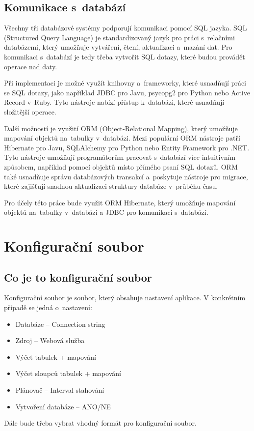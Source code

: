 \documentclass[czech, kiv, ba, he, iso690auyr, pdf]{fasthesis}
\begin{document}
\section{Komunikace s~databází}
Všechny tři databázové systémy podporují komunikaci pomocí SQL jazyka.
SQL (Structured Query Language) je standardizovaný jazyk pro práci s~relačními databázemi,
který umožňuje vytváření, čtení, aktualizaci a~mazání dat.
Pro komunikaci s~databází je tedy třeba vytvořit SQL dotazy, které budou provádět operace nad daty.

Při implementaci je možné využít knihovny a~frameworky, které usnadňují práci se SQL dotazy, 
jako například JDBC pro Javu, psycopg2 pro Python nebo Active Record v~Ruby. 
Tyto nástroje nabízí přístup k~databázi, které usnadňují složitější operace.

Další možností je využití ORM (Object-Relational Mapping), který umožňuje mapování objektů na~tabulky v~databázi.
Mezi populární ORM nástroje patří Hibernate pro Javu, SQLAlchemy pro Python nebo Entity Framework pro .NET. 
Tyto nástroje umožňují programátorům pracovat s~databází více intuitivním způsobem, například pomocí objektů 
místo přímého psaní SQL dotazů. ORM také usnadňuje správu databázových transakcí a~poskytuje nástroje pro migrace, 
které zajišťují snadnou aktualizaci struktury databáze v~průběhu času.

Pro účely této práce bude využit ORM Hibernate, který umožňuje mapování objektů na~tabulky v~databázi a JDBC pro komunikaci s~databází.

\chapter{Konfigurační soubor}
\section{Co je to konfigurační soubor}
Konfigurační soubor je soubor, který obsahuje nastavení aplikace.
V konkrétním případě se jedná o~nastavení:
\begin{itemize}
    \item Databáze -- Connection string
    \item Zdroj -- Webová služba
    \item Výčet tabulek + mapování
    \item Výčet sloupců tabulek + mapování
    \item Plánovač -- Interval stahování
    \item Vytvoření databáze -- ANO/NE
\end{itemize}
Dále bude třeba vybrat vhodný formát pro konfigurační soubor.
\end{document}
